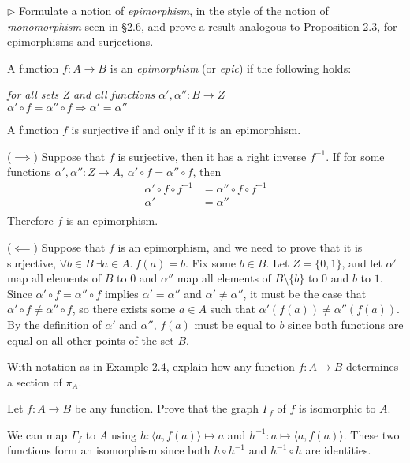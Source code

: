 \begin{problem}
  $\rhd$ Formulate a notion of \textit{epimorphism}, in the style
  of the notion of \textit{monomorphism} seen in \S 2.6, and prove a result
  analogous to Proposition 2.3, for epimorphisms and surjections.
\end{problem}
\begin{solution}
  A function $f: A \to B$ is an {\em epimorphism} (or {\em epic}) if
  the following holds:
  \begin{center}
    {\em for all sets Z and all functions $\alpha', \alpha'': B \to Z$ \\
     $\alpha' \circ f = \alpha'' \circ f \Longrightarrow \alpha' = \alpha''$}
  \end{center}

  A function $f$ is surjective if and only if it is an epimorphism.

  ($\implies$) Suppose that $f$ is surjective, then it has a right
  inverse $f^{-1}$. If for some functions $\alpha', \alpha'': Z \to A$,
  $\alpha' \circ f = \alpha'' \circ f$, then
  \begin{align*}
    \alpha' \circ f \circ f^{-1} &= \alpha'' \circ f \circ f^{-1} \\
    \alpha' &= \alpha'' \\
  \end{align*}
  Therefore $f$ is an epimorphism.

  ($\impliedby$) Suppose that $f$ is an epimorphism, and we need to prove that
  it is surjective, $\forall b \in B~\exists a \in A.~f(a) = b$.
  Fix some $b \in B$. Let $Z=\{0, 1\}$, and let $\alpha'$ map all elements of
  $B$ to $0$ and $\alpha''$ map all elements of $B\setminus \{b\}$ to $0$ and
  $b$ to $1$. Since $\alpha' \circ f = \alpha'' \circ f$ implies
  $\alpha' = \alpha''$ and $\alpha' \neq \alpha''$, it must be the case that
  $\alpha' \circ f \neq \alpha'' \circ f$, so there exists some $a \in A$ such
  that $\alpha'(f(a)) \neq \alpha''(f(a))$. By the definition of $\alpha'$ and
  $\alpha''$, $f(a)$ must be equal to $b$ since both functions are equal on all
  other points of the set $B$.
\end{solution}

\begin{problem}
  With notation as in Example 2.4, explain how any function $f:A\to B$
  determines a section of $\pi_A$.
\end{problem}

\begin{problem}
  Let $f:A\to B$ be any function. Prove that the graph $\Gamma_f$ of $f$ is
  isomorphic to $A$.
\end{problem}
\begin{solution}
  We can map $\Gamma_f$ to $A$ using $h: \langle a, f(a)\rangle \mapsto a$ and
  $h^{-1}: a \mapsto \langle a, f(a) \rangle$. These two functions form
  an isomorphism since both $h \circ h^{-1}$ and $h^{-1} \circ h$ are identities.
\end{solution}

